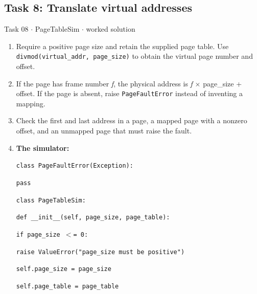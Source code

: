 \documentclass[11pt]{article}
\begin{document}
\begin{keepsection}\subsection{Task 8: Translate virtual addresses}

\begin{workedbox}{Task 08 \ensuremath{\cdot} PageTableSim \ensuremath{\cdot} worked solution}
\begin{enumerate}
\item Require a positive page size and retain the supplied page table. Use \texttt{divmod(virtual\_addr, page\_size)} to obtain the virtual page number and offset.
\item If the page has frame number \textit{f}, the physical address is \textit{f} \ensuremath{\times} page\_size + offset. If the page is absent, raise \texttt{PageFaultError} instead of inventing a mapping.
\item Check the first and last address in a page, a mapped page with a nonzero offset, and an unmapped page that must raise the fault.
\item {}
\textbf{The simulator:}
\begin{tcolorbox}[colback=Paperblue,colframe=Paperblue,boxrule=0pt,arc=0pt,left=7pt,right=7pt,top=5pt,bottom=5pt]\small\sloppy
\noindent\hspace*{0em}\texttt{class PageFaultError(Exception):}\par
\noindent\hspace*{1em}\texttt{pass}\par
\noindent\hspace*{0em}\texttt{}\par
\noindent\hspace*{0em}\texttt{class PageTableSim:}\par
\noindent\hspace*{1em}\texttt{def \_\_init\_\_(self, page\_size, page\_table):}\par
\noindent\hspace*{3em}\texttt{if page\_size \ensuremath{<}= 0:}\par
\noindent\hspace*{5em}\texttt{raise ValueError("page\_size must be positive")}\par
\noindent\hspace*{3em}\texttt{self.page\_size = page\_size}\par
\noindent\hspace*{3em}\texttt{self.page\_table = page\_table}\par

\end{tcolorbox}
\end{enumerate}
\end{workedbox}
\end{keepsection}
\end{document}
